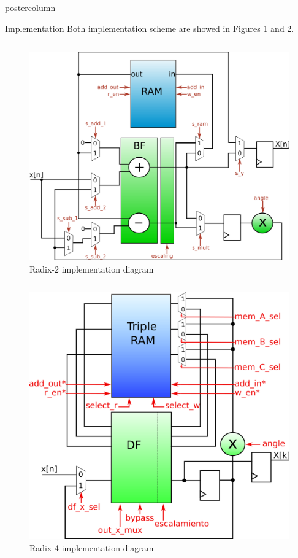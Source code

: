 \documentclass[final]{beamer}
\begin{document}
\begin{frame}{}
\begin{columns}
\begin{column}{.5\textwidth}
\begin{beamercolorbox}[center,wd=0.9\textwidth]{postercolumn}
\begin{minipage}[T]{.99\textwidth}
{\begin{block}{Implementation}
			Both implementation scheme are showed in Figures \ref{fig:datapathmem} and \ref{fig:datapathR4control}.
			
			\begin{column}{.44\textwidth}
				\begin{figure}[htb!]
				        \centering
				        \includegraphics[width=12cm]{./figures/datapathMem.png}
				        \caption{Radix-2 implementation diagram}
				        \label{fig:datapathmem}
				\end{figure}
			\end{column}
			\begin{column}{.45\textwidth}
				\begin{figure}[htb!]
				        \centering
				        \includegraphics[width=11
				        cm]{./figures/r4control.png}
				        \caption{Radix-4 implementation diagram}
				        \label{fig:datapathR4control}
				\end{figure}
			\end{column}
	      

\end{block}}
\end{minipage}
\end{beamercolorbox}
\end{column}
\end{columns}
\end{frame}
\end{document}
